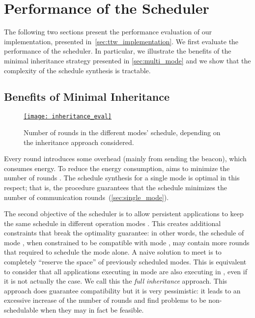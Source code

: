 
\section{Performance of the \TTW Scheduler}
\label{sec:ttw_evaluation_sched}

The following two sections present the performance evaluation of our \TTW implementation, presented in~\cref{sec:ttw_implementation}.
We first evaluate the performance of the scheduler. In particular, we illustrate the benefits of the minimal inheritance strategy presented in \cref{sec:multi_mode} and we show that the complexity of the schedule synthesis is tractable.

\subsection{Benefits of Minimal Inheritance}

\begin{figure}
  \centering
  \href{\ttwfig{Figure-11}}{%
  \texttt{[image: inheritance\_eval]}}
  \caption{Number of rounds in the different modes' schedule, depending on the inheritance approach considered.
  }
  \label{fig:inheritance_eval}
\end{figure}

Every round introduces some overhead (mainly from  sending the beacon), which consumes energy.
To reduce the energy consumption, \TTW aims to minimize the number of rounds .
The schedule synthesis for a single mode is optimal in this respect; that is, the procedure guarantees that the schedule minimizes the number of communication rounds~(\cref{sec:single_mode}).

The second objective of the scheduler is to allow persistent applications to keep the same schedule in different operation modes .
This creates additional constraints that break the optimality guarantee: in other words, the schedule of mode \modej, when constrained to be compatible with mode \modei, may contain more rounds that required to schedule the mode \modej alone.
A naive solution to meet  is to completely ``reserve the space'' of previously scheduled modes. This is equivalent to consider that all applications executing in mode \modei are also executing in \modej, even if it is not actually the case. We call this the \emph{full inheritance} approach.
This approach does guarantee compatibility but it is very pessimistic: it leads to an excessive increase of the number of rounds and find problems to be non-schedulable when they may in fact be feasible.


